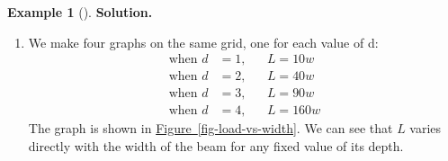 \documentclass[10pt,]{book}
\theoremstyle{plain}
\theoremstyle{definition}
\theoremstyle{definition}
\theoremstyle{definition}
\newtheorem{example}[theorem]{Example}
\theoremstyle{definition}
\theoremstyle{definition}
\numberwithin{equation}{section}
\newcounter{figstack}
\newlength\fight
\newcommand\pushValignCaptionBottom[5][b]{%
\stepcounter{figstack}%
\expandafter\def\csname %
figalign\romannumeral\value{figstack}\endcsname{#1}%
\expandafter\def\csname %
figtype\romannumeral\value{figstack}\endcsname{#2}%
\expandafter\def\csname %
figwd\romannumeral\value{figstack}\endcsname{#3}%
\expandafter\def\csname %
figcontent\romannumeral\value{figstack}\endcsname{#4}%
\expandafter\def\csname %
figcap\romannumeral\value{figstack}\endcsname{#5}%
\setbox0=\hbox{%
\begin{#2}{#3}#4\end{#2}}%
\ifdim\dimexpr\ht0+\dp0\relax>\fight\global\setlength{\fight}{%
\dimexpr\ht0+\dp0\relax}\fi%
}
\newcommand{\amp}{ & }
\begin{document}
\begin{example}[]
%
\par\medskip\noindent%
\textbf{Solution.}\quad 
\leavevmode%
\begin{enumerate}[label=*\alph**]
\item\hypertarget{li-588}{}
        We make four graphs on the same grid, one for each value of d:
        \begin{align*}
        \text{when } d \amp= 1, \amp\amp L = 10w \\
        \text{when } d \amp= 2, \amp\amp L = 40w \\
        \text{when } d \amp= 3, \amp\amp L = 90w \\
        \text{when } d \amp= 4, \amp\amp L = 160w
        \end{align*}
        The graph is shown in \hyperref[fig-load-vs-width]{Figure~\ref{fig-load-vs-width}}. We can see that \(L\) varies directly with the width of the beam for any fixed value of its depth.
        \leavevmode%
\end{enumerate}
\end{example}
\end{document}
